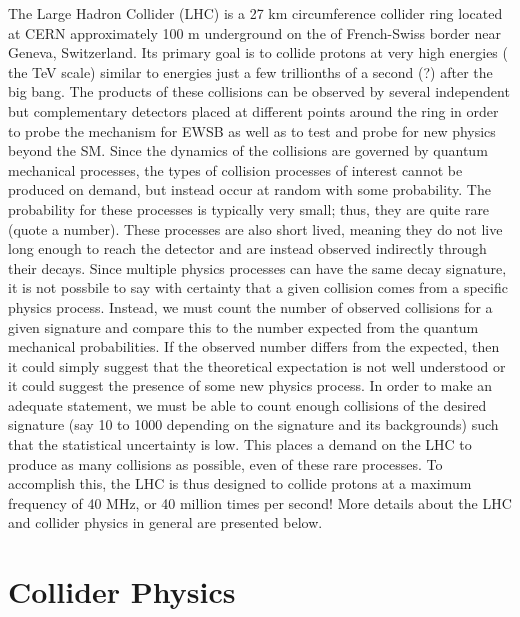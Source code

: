 



The Large Hadron Collider (LHC) \cite{lhc} is
a 27 km circumference collider ring
located at CERN approximately 100 m underground on the 
of French-Swiss border near Geneva, Switzerland.
Its primary goal is to collide protons at very high energies (
the TeV scale)  similar to energies just a few trillionths of a second (?)
after the big bang.  %
The products of these collisions can 
be observed
by several independent but complementary detectors placed at different
points around the ring in order to probe the mechanism
for EWSB as well as to test and probe for new physics beyond the SM.
Since the dynamics of the collisions are governed by quantum mechanical
processes, the types of collision processes of interest cannot be
produced on demand, but instead occur at random with some
probability.
The probability for these processes is typically very small; thus, they are quite
rare (quote a number).
These processes are also short lived, meaning they do not live long
enough to reach the detector and are instead observed indirectly through their
decays. Since multiple physics processes can have the same decay 
signature, it is not possbile to say with certainty that a given 
collision comes from a specific physics process. Instead, 
we must count the number of observed collisions for a given signature
and compare this to the number expected from the 
quantum mechanical probabilities.  If the observed number differs
from the expected, then it could simply suggest that the theoretical expectation
is not well understood or it could suggest the presence of some new physics
process.
In order to make an adequate statement, we must be able to count
enough collisions of the desired signature (say 10 to 1000 depending on the
signature and its backgrounds) 
such that the statistical uncertainty is low.  This places a demand
on the LHC to produce as many collisions as possible, even of these rare
processes. To accomplish this, the LHC is thus designed to collide
protons at a maximum frequency of 40 MHz, or 40 million times per second!
More details about the LHC and collider physics in general are presented
below.



\section{Collider Physics}

